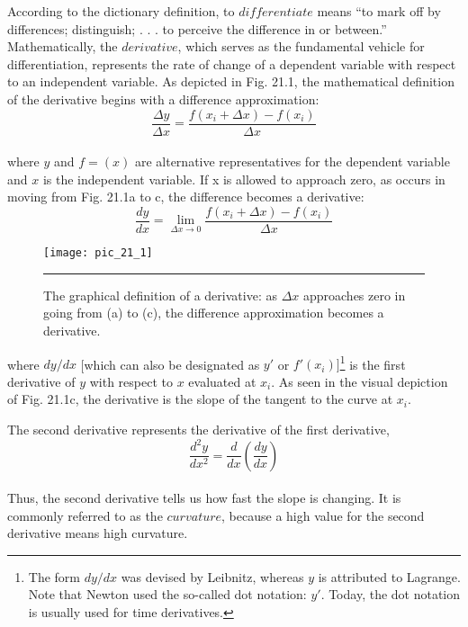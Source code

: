 \documentclass[../main.tex]{subfiles}
\begin{document}
According to the dictionary definition, to $differentiate$ means “to mark off by differences; distinguish; . . . to perceive the difference in or between.” Mathematically, the $derivative$, which serves as the fundamental vehicle for differentiation, represents the rate of change
of a dependent variable with respect to an independent variable. As depicted in Fig. 21.1, the
mathematical definition of the derivative begins with a difference approximation:
\begin{equation}
	\tag{21.6}
	\dfrac{\Delta y}{\Delta x} = \dfrac{f(x_{i} + \Delta x)-f(x_{i})}{\Delta x}
\end{equation}\\
where $y$ and $f=(x)$ are alternative representatives for the dependent variable and $x$ is the
independent variable. If x is allowed to approach zero, as occurs in moving from Fig. 21.1a
to c, the difference becomes a derivative:
\begin{equation}
	\tag{21.7}
	\dfrac{dy}{dx} = \lim \limits_{\Delta x \longrightarrow 0} \dfrac{f(x_{i} + \Delta x) - f(x_{i})}{\Delta x}
\end{equation}



\begin{figure}[hbt!]
	\centering
	\texttt{[image: pic\_21\_1]}
	\caption{\textsf{The graphical definition of a derivative: as $\Delta x$ approaches zero in going from (a) to (c), the difference approximation
becomes a derivative. }} \hrule
	\label{pic.21.1}
\end{figure}
\pagebreak
where $dy/dx$ [which can also be designated as $y'$ or $f'(x_{i})]$\footnote{ The form $dy/dx$ was devised by Leibnitz, whereas $y$ is attributed to Lagrange. Note that Newton used the 
so-called dot notation: $y'$. Today, the dot notation is usually used for time derivatives.} is the first derivative of $y$ with
respect to $x$ evaluated at $x_{i}$. As seen in the visual depiction of Fig. 21.1c, the derivative is
the slope of the tangent to the curve at $x_{i}$.

The second derivative represents the derivative of the first derivative,
\begin{equation}
	\tag{21.8}
	\dfrac{d^{2} y}{dx^{2}} = \dfrac{d}{dx} \left( \dfrac{dy}{dx} \right)
\end{equation}\\
Thus, the second derivative tells us how fast the slope is changing. It is commonly referred
to as the $curvature$, because a high value for the second derivative means high curvature.
\end{document}
